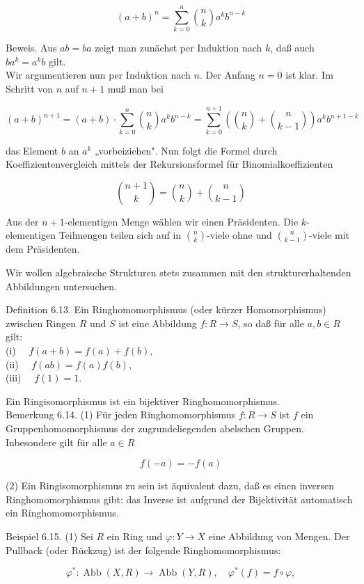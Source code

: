 \documentclass[10pt, letterpaper]{article}
\begin{document}
$$
(a+b)^{n}=\sum_{k=0}^{n}\binom{n}{k} a^{k} b^{n-k}
$$

Beweis. Aus $a b=b a$ zeigt man zunächst per Induktion nach $k$, daß auch $b a^{k}=a^{k} b$ gilt.\\
Wir argumentieren nun per Induktion nach $n$. Der Anfang $n=0$ ist klar. Im Schritt von $n$ auf $n+1$ muß man bei

$$
(a+b)^{n+1}=(a+b) \cdot \sum_{k=0}^{n}\binom{n}{k} a^{k} b^{n-k}=\sum_{k=0}^{n+1}\left(\binom{n}{k}+\binom{n}{k-1}\right) a^{k} b^{n+1-k}
$$

das Element $b$ an $a^{k}$ „vorbeiziehen". Nun folgt die Formel durch Koeffizientenvergleich mittels der Rekursionsformel für Binomialkoeffizienten

$$
\binom{n+1}{k}=\binom{n}{k}+\binom{n}{k-1}
$$

Aus der $n+1$-elementigen Menge wählen wir einen Präsidenten. Die $k$-elementigen Teilmengen teilen sich auf in $\binom{n}{k}$-viele ohne und $\binom{n}{k-1}$-viele mit dem Präsidenten.

Wir wollen algebraische Strukturen stets zusammen mit den strukturerhaltenden Abbildungen untersuchen.

Definition 6.13. Ein Ringhomomorphismus (oder kürzer Homomorphismus) zwischen Ringen $R$ und $S$ ist eine Abbildung $f: R \rightarrow S$, so daß für alle $a, b \in R$ gilt:\\
(i) $\quad f(a+b)=f(a)+f(b)$,\\
(ii) $\quad f(a b)=f(a) f(b)$,\\
(iii) $\quad f(1)=1$.

Ein Ringisomorphismus ist ein bijektiver Ringhomomorphismus.\\
Bemerkung 6.14. (1) Für jeden Ringhomomorphismus $f: R \rightarrow S$ ist $f$ ein Gruppenhomomorphismus der zugrundeliegenden abelschen Gruppen. Inbesondere gilt für alle $a \in R$

$$
f(-a)=-f(a)
$$

(2) Ein Ringisomorphismus zu sein ist äquivalent dazu, daß es einen inversen Ringhomomorphismus gibt: das Inverse ist aufgrund der Bijektivität automatisch ein Ringhomomorphismus.

Beispiel 6.15. (1) Sei $R$ ein Ring und $\varphi: Y \rightarrow X$ eine Abbildung von Mengen. Der Pullback (oder Rückzug) ist der folgende Ringhomomorphismus:

$$
\varphi^{*}: \operatorname{Abb}(X, R) \rightarrow \operatorname{Abb}(Y, R), \quad \varphi^{*}(f)=f \circ \varphi,
$$
\end{document}
